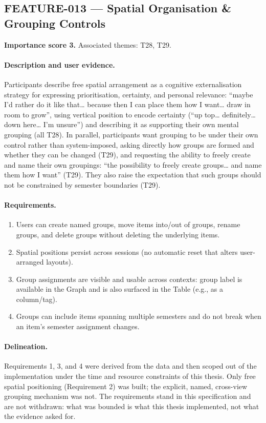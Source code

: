 \subsection{FEATURE-013 --- Spatial Organisation \& Grouping Controls}
\label{feat:013}
\textbf{Importance score 3.} Associated themes: T28, T29.

\paragraph{Description and user evidence.}
Participants describe free spatial arrangement as a cognitive externalisation strategy for expressing prioritisation, certainty, and personal relevance: \enquote{maybe I'd rather do it like that… because then I can place them how I want… draw in room to grow}, using vertical position to encode certainty (\enquote{up top… definitely… down here… I'm unsure}) and describing it as supporting their own mental grouping (all T28). In parallel, participants want grouping to be under their own control rather than system-imposed, asking directly how groups are formed and whether they can be changed (T29), and requesting the ability to freely create and name their own groupings: \enquote{the possibility to freely create groups… and name them how I want} (T29). They also raise the expectation that such groups should not be constrained by semester boundaries (T29).

\paragraph{Requirements.}
\begin{enumerate}
    \item Users can create named groups, move items into/out of groups, rename groups, and delete groups without deleting the underlying items.
    \item Spatial positions persist across sessions (no automatic reset that alters user-arranged layouts).
    \item Group assignments are visible and usable across contexts: group label is available in the Graph and is also surfaced in the Table (e.g., as a column/tag).
    \item Groups can include items spanning multiple semesters and do not break when an item's semester assignment changes.
\end{enumerate}

\paragraph{Delineation.}
Requirements 1, 3, and 4 were derived from the data and then scoped out of the implementation under the time and resource constraints of this thesis. Only free spatial positioning (Requirement 2) was built; the explicit, named, cross-view grouping mechanism was not. The requirements stand in this specification and are not withdrawn: what was bounded is what this thesis implemented, not what the evidence asked for.

